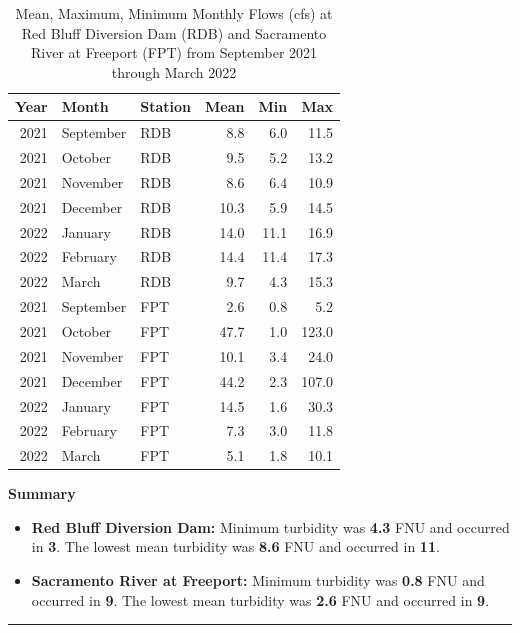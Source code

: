\documentclass[
]{book}
\providecommand{\tightlist}{%
  \setlength{\itemsep}{0pt}\setlength{\parskip}{0pt}}
\theoremstyle{definition}
\theoremstyle{definition}
\theoremstyle{definition}
\theoremstyle{definition}
\theoremstyle{remark}
\begin{document}
\begin{table}
\centering
\caption{Mean, Maximum, Minimum Monthly Flows (cfs) at Red Bluff Diversion Dam (RDB) and Sacramento River at Freeport (FPT) from September 2021 through March 2022}
\centering
\begin{tabular}[t]{rllrrr}
\hline
Year & Month & Station & Mean & Min & Max\\
\hline
2021 & September & RDB & 8.8 & 6.0 & 11.5\\
\hline
2021 & October & RDB & 9.5 & 5.2 & 13.2\\
\hline
2021 & November & RDB & 8.6 & 6.4 & 10.9\\
\hline
2021 & December & RDB & 10.3 & 5.9 & 14.5\\
\hline
2022 & January & RDB & 14.0 & 11.1 & 16.9\\
\hline
2022 & February & RDB & 14.4 & 11.4 & 17.3\\
\hline
2022 & March & RDB & 9.7 & 4.3 & 15.3\\
\hline
2021 & September & FPT & 2.6 & 0.8 & 5.2\\
\hline
2021 & October & FPT & 47.7 & 1.0 & 123.0\\
\hline
2021 & November & FPT & 10.1 & 3.4 & 24.0\\
\hline
2021 & December & FPT & 44.2 & 2.3 & 107.0\\
\hline
2022 & January & FPT & 14.5 & 1.6 & 30.3\\
\hline
2022 & February & FPT & 7.3 & 3.0 & 11.8\\
\hline
2022 & March & FPT & 5.1 & 1.8 & 10.1\\
\hline
\end{tabular}
\end{table}

\textbf{Summary}

\begin{itemize}
\tightlist
\item
  \textbf{Red Bluff Diversion Dam:} Minimum turbidity was \textbf{4.3} FNU and occurred in \textbf{3}. The lowest mean turbidity was \textbf{8.6} FNU and occurred in \textbf{11}.
\item
  \textbf{Sacramento River at Freeport:} Minimum turbidity was \textbf{0.8} FNU and occurred in \textbf{9}. The lowest mean turbidity was \textbf{2.6} FNU and occurred in \textbf{9}.
\end{itemize}

\begin{center}\rule{0.5\linewidth}{0.5pt}\end{center}
\end{document}
